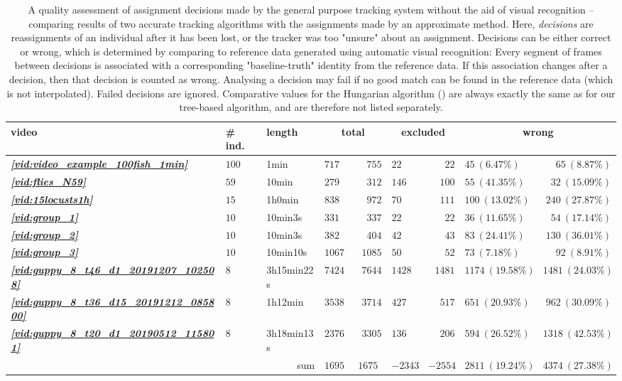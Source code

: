 \documentclass[9pt,lineno]{elife}
\newcommand{\vidref}[1]{\textit{\textbf{\ref{#1}}}}
\begin{document}
\begin{table}

\begin{tabular}{l l l || l r | l r | l r }
\toprule
video & {\# ind.} & length & \multicolumn{2}{c|}{total} & \multicolumn{2}{c|}{excluded}  & \multicolumn{2}{c}{wrong} \\
\midrule
\vidref{vid:video_example_100fish_1min} & $ 100 $ &  1min  & $ 717 $ & $ 755 $ & $ 22 $ & $ 22 $ & $ 45 \ ( 6.47 \%)$ & $ 65 \ ( 8.87 \%)$\\
\vidref{vid:flies_N59} & $ 59 $ &  10min  & $ 279 $ & $ 312 $ & $ 146 $ & $ 100 $ & $ 55 \ ( 41.35 \%)$ & $ 32 \ ( 15.09 \%)$\\
\vidref{vid:15locusts1h} & $ 15 $ &  1h0min  & $ 838 $ & $ 972 $ & $ 70 $ & $ 111 $ & $ 100 \ ( 13.02 \%)$ & $ 240 \ ( 27.87 \%)$\\
\vidref{vid:group_1} & $ 10 $ &  10min3s  & $ 331 $ & $ 337 $ & $ 22 $ & $ 22 $ & $ 36 \ ( 11.65 \%)$ & $ 54 \ ( 17.14 \%)$\\
\vidref{vid:group_2} & $ 10 $ &  10min3s  & $ 382 $ & $ 404 $ & $ 42 $ & $ 43 $ & $ 83 \ ( 24.41 \%)$ & $ 130 \ ( 36.01 \%)$\\
\vidref{vid:group_3} & $ 10 $ &  10min10s  & $ 1067 $ & $ 1085 $ & $ 50 $ & $ 52 $ & $ 73 \ ( 7.18 \%)$ & $ 92 \ ( 8.91 \%)$\\
\vidref{vid:guppy_8_t46_d1_20191207_102508} & $ 8 $ &  3h15min22s  & $ 7424 $ & $ 7644 $ & $ 1428 $ & $ 1481 $ & $ 1174 \ ( 19.58 \%)$ & $ 1481 \ ( 24.03 \%)$\\
\vidref{vid:guppy_8_t36_d15_20191212_085800} & $ 8 $ &  1h12min  & $ 3538 $ & $ 3714 $ & $ 427 $ & $ 517 $ & $ 651 \ ( 20.93 \%)$ & $ 962 \ ( 30.09 \%)$\\
\vidref{vid:guppy_8_t20_d1_20190512_115801} & $ 8 $ &  3h18min13s  & $ 2376 $ & $ 3305 $ & $ 136 $ & $ 206 $ & $ 594 \ ( 26.52 \%)$ & $ 1318 \ ( 42.53 \%)$\\
\hline
\multicolumn{3}{r||}{sum} & $ 16952 $ & $ 16754 $ & $ - 2343 $ & $- 2554 $ &$ 2811 \ ( 19.24 \%)$ & $ 4374 \ ( 27.38 \%)$ \\
\bottomrule
\end{tabular}
\medskip
\caption{\label{tab:decisions}A quality assessment of assignment decisions made by the general purpose tracking system without the aid of visual recognition -- comparing results of two accurate tracking algorithms with the assignments made by an approximate method. Here, \textit{decisions} are reassignments of an individual after it has been lost, or the tracker was too "unsure" about an assignment. Decisions can be either correct or wrong, which is determined by comparing to reference data generated using automatic visual recognition: Every segment of frames between decisions is associated with a corresponding "baseline-truth" identity from the reference data. If this association changes after a decision, then that decision is counted as wrong. Analysing a decision may fail if no good match can be found in the reference data (which is not interpolated). Failed decisions are ignored. Comparative values for the Hungarian algorithm (\cite{kuhn1955hungarian}) are always exactly the same as for our tree-based algorithm, and are therefore not listed separately.
}
\end{table}
\end{document}
